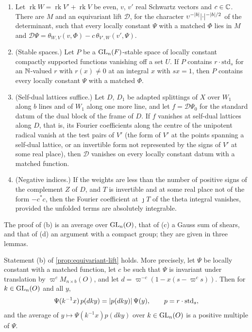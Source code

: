 \begin{proposition}\label{prop:equivariant-lift}
\begin{enumerate}[label=\textup{(\alph*)}]
\item Let $\operatorname{rk}W=\operatorname{rk}V'+\operatorname{rk}V$ be even, $v$, $v'$ real Schwartz vectors and $c\in\mathbb{C}$. There are $M$ and an equivariant lift $\mathcal D$, for the character
$\upsilon^{-\lvert b\rvert}\lvert \cdot\rvert^{-\lvert b\rvert/2}$ of the determinant, such that every locally constant $\Psi$ with a matched $\Phi$ lies in $M$ and $\mathcal D\Psi=\theta_{W,V}(v,\Phi)-c\,\theta_{V',W}(v',\Psi)$.
\item (Stable spaces.) Let $P$ be a $\operatorname{GL}_n(F)$-stable space of locally constant compactly supported functions vanishing off a set $U$. If $P$ contains $r\cdot\mathrm{std}_s$ for an $\mathbb{N}$-valued $r$ with
$r(x)\ne0$ at an integral $x$ with $sx=1$, then $P$ contains every locally constant $\Psi$ with a matched $\Phi$.
\item (Self-dual lattices suffice.) Let $D$, $D_1$ be adapted splittings of $X$ over $W_1$ along $b$ lines and of $W_1$ along one more line, and let $f=\mathcal D\Psi_0$ for the standard datum of the dual
block of the frame of $D$. If $f$ vanishes at self-dual lattices along $D$, that is, its Fourier coefficients along the centre of the unipotent radical vanish at the test pairs of $V'$ (the form
of $V'$ at the points spanning a self-dual lattice, or an invertible form not represented by the signs of $V'$ at some real place), then $\mathcal D$ vanishes on every locally constant datum with a
matched function.
\item (Negative indices.) If the weights are less than the number of positive signs of the complement $Z$ of $D$, and $T$ is invertible and at some real place not of the form $-c^*c$, then
the Fourier coefficient at $\jmath T$ of the theta integral vanishes, provided the unfolded terms are absolutely integrable.
\end{enumerate}
\end{proposition}

The proof of (b) is an average over $\operatorname{GL}_n(O)$, that of (c) a Gauss sum of shears, and that of (d) an argument with a compact group; they are given in three lemmas.

\begin{lemma}[Averaging]\label{lem:exchange-averaging}
Statement \textup{(b)} of \cref{prop:equivariant-lift} holds. More precisely, let $\Psi$ be locally constant with a matched function, let $c$ be such that $\Psi$ is invariant under translation by
$\varpi^cM_{n\times b}(O)$, and let $d=\varpi^{-c}(1-x(s-\varpi^cs))$. Then for $k\in\operatorname{GL}_n(O)$ and all $y$,
\[
  \Psi(k^{-1}x)\,p(dky)=\lvert p(dky)\rvert\,\Psi(y),\qquad p=r\cdot\mathrm{std}_s,
\]
and the average of $y\mapsto\Psi(k^{-1}x)p(dky)$ over $k\in\operatorname{GL}_n(O)$ is a positive multiple of $\Psi$.
\end{lemma}

